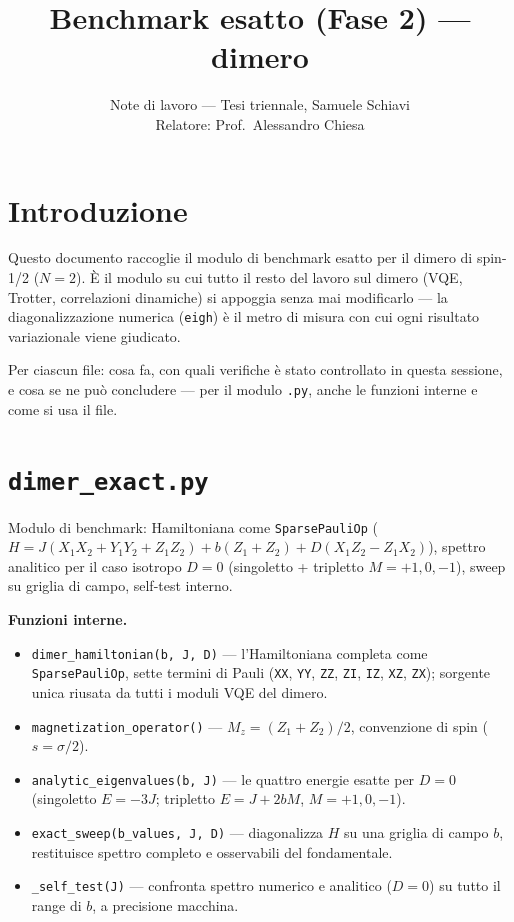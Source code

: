 \documentclass[11pt,a4paper]{article}
\title{Benchmark esatto (Fase 2) — dimero}
\author{Note di lavoro — Tesi triennale, Samuele Schiavi\\ Relatore: Prof.\ Alessandro Chiesa}
\date{}
\begin{document}
\maketitle

\section*{Introduzione}

Questo documento raccoglie il modulo di benchmark esatto per il dimero di spin-1/2
($N=2$). È il modulo su cui tutto il resto del lavoro sul dimero (VQE, Trotter,
correlazioni dinamiche) si appoggia senza mai modificarlo — la diagonalizzazione
numerica (\texttt{eigh}) è il metro di misura con cui ogni risultato variazionale
viene giudicato.

Per ciascun file: cosa fa, con quali verifiche è stato controllato in questa sessione,
e cosa se ne può concludere — per il modulo \texttt{.py}, anche le funzioni interne e
come si usa il file.

\section*{\texttt{dimer\_exact.py}}

Modulo di benchmark: Hamiltoniana come \texttt{SparsePauliOp}
($H=J(X_1X_2+Y_1Y_2+Z_1Z_2)+b(Z_1+Z_2)+D(X_1Z_2-Z_1X_2)$), spettro analitico per il
caso isotropo $D=0$ (singoletto + tripletto $M=+1,0,-1$), sweep su griglia di campo,
self-test interno.

\textbf{Funzioni interne.}
\begin{itemize}
\item \texttt{dimer\_hamiltonian(b,\ J,\ D)} — l'Hamiltoniana completa come
\texttt{SparsePauliOp}, sette termini di Pauli (\texttt{XX}, \texttt{YY},
\texttt{ZZ}, \texttt{ZI}, \texttt{IZ}, \texttt{XZ}, \texttt{ZX}); sorgente unica
riusata da tutti i moduli VQE del dimero.
\item \texttt{magnetization\_operator()} — $M_z=(Z_1+Z_2)/2$, convenzione di spin
($s=\sigma/2$).
\item \texttt{analytic\_eigenvalues(b,\ J)} — le quattro energie esatte per $D=0$
(singoletto $E=-3J$; tripletto $E=J+2bM$, $M=+1,0,-1$).
\item \texttt{exact\_sweep(b\_values,\ J,\ D)} — diagonalizza $H$ su una griglia di
campo $b$, restituisce spettro completo e osservabili del fondamentale.
\item \texttt{\_self\_test(J)} — confronta spettro numerico e analitico ($D=0$) su
tutto il range di $b$, a precisione macchina.
\end{itemize}
\end{document}
